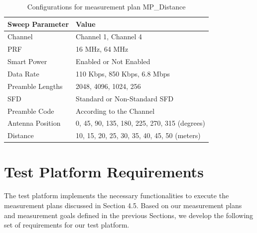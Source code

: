 \begin{table}[]
    \centering
    \caption{Configurations for measurement plan MP\_Distance}
    \label{tab:configurationsforMPDistance}
    \begin{tabular}{|l|l|}
        \hline
        \textbf{Sweep Parameter} & \textbf{Value}                               \\ \hline
        Channel                  & Channel 1, Channel 4                         \\ \hline
        PRF                      & 16 MHz, 64 MHz                               \\ \hline
        Smart Power              & Enabled or Not Enabled                       \\ \hline
        Data Rate                & 110 Kbps, 850 Kbps, 6.8 Mbps                 \\ \hline
        Preamble Lengths         & 2048, 4096, 1024, 256                        \\ \hline
        SFD                      & Standard or Non-Standard SFD                 \\ \hline
        Preamble Code            & According to the Channel                     \\ \hline
        Antenna Position         & 0, 45, 90, 135, 180, 225, 270, 315 (degrees) \\ \hline
        Distance                 & 10, 15, 20, 25, 30, 35, 40, 45, 50 (meters)  \\ \hline
    \end{tabular}
\end{table}
\section{Test Platform Requirements}

The test platform implements the necessary functionalities to execute the measurement plans discussed in Section 4.5. Based on our measurement plans and measurement goals defined in the previous Sections, we develop the following set of requirements for our test platform.

